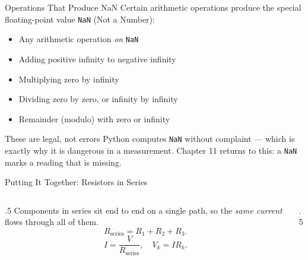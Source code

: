 \documentclass[9pt,aspectratio=169,xcolor=table]{beamer}
\begin{document}
\begin{frame}{Operations That Produce NaN}
    \leavevmode
    Certain arithmetic operations produce the special floating-point
    value \texttt{NaN} (Not a Number):

    \vspace{2mm}
    \begin{itemize}\small
        \item Any arithmetic operation \emph{on} \texttt{NaN}
        \item Adding positive infinity to negative infinity
        \item Multiplying zero by infinity
        \item Dividing zero by zero, or infinity by infinity
        \item Remainder (modulo) with zero or infinity
    \end{itemize}

    \vspace{3mm}
    \begin{alertblock}{These are legal, not errors}
        Python computes \texttt{NaN} without complaint --- which is
        exactly why it is dangerous in a measurement. Chapter 11 returns
        to this: a \texttt{NaN} marks a reading that is missing.
    \end{alertblock}
\end{frame}

\begin{frame}{Putting It Together: Resistors in Series}
    \leavevmode
    \begin{columns}[t]
        \begin{column}{.5\textwidth}
            Components in \alert{series} sit end to end on a single
            path, so the \emph{same current} flows through all of them.
            \[
            R_{\text{series}} = R_1 + R_2 + R_3.
            \]
            \[
            I = \frac{V}{R_{\text{series}}}, \quad V_k = I R_k.
            \]
        \end{column}
        \begin{column}{.5\textwidth}
            \begin{center}
            \end{center}
        \end{column}
    \end{columns}
\end{frame}
\end{document}
